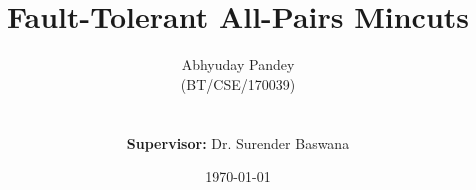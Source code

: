 % 
% 
%
%
%
%
%
%
%
%
% 
% 


\title{Fault-Tolerant All-Pairs Mincuts}

\author{Abhyuday Pandey\\(BT/CSE/170039)\\\\\\\textbf{Supervisor:} Dr. Surender Baswana}
\date{\today}


